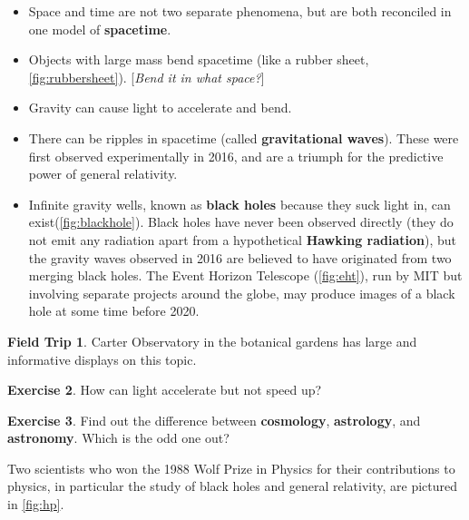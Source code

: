 \documentclass[a4paper]{amsbook}
\theoremstyle{definition}
\newtheorem{exercise}{Exercise}
\numberwithin{exercise}{chapter}
\numberwithin{exercise}{chapter}
\newtheorem{trip}[exercise]{Field Trip}
\begin{document}
\begin{itemize}
  \item Space and time are not two separate phenomena, but are both reconciled in one model of \textbf{spacetime}.
  \item Objects with large mass bend spacetime (like a rubber sheet, \cref{fig:rubbersheet}). [\emph{Bend it in what space?}]
  \item Gravity can cause light to accelerate and bend.
  \item There can be ripples in spacetime (called \textbf{gravitational waves}). These were first observed experimentally in 2016, and are a triumph
        for the predictive power of general relativity.
  \item Infinite gravity wells, known as \textbf{black holes} because they suck light in, can exist(\cref{fig:blackhole}). Black holes have never
        been observed directly (they do not emit any radiation apart from a hypothetical \textbf{Hawking radiation}), but the gravity waves observed
        in 2016 are believed to have originated from two merging black holes. The Event Horizon Telescope (\cref{fig:eht}), run by MIT but involving
        separate projects around the globe, may produce images of a black hole at some time before 2020.
\end{itemize}

\begin{trip}
  Carter Observatory in the botanical gardens has large and informative displays on this topic.
\end{trip}

\begin{exercise}
  How can light accelerate but not speed up?
\end{exercise}

\begin{exercise}
  Find out the difference between \textbf{cosmology}, \textbf{astrology}, and \textbf{astronomy}. Which is the odd one out?
\end{exercise}

Two scientists who won the 1988 Wolf Prize in Physics for their contributions to physics, in particular the study of black holes and
general relativity, are pictured in \cref{fig:hp}.
\end{document}
